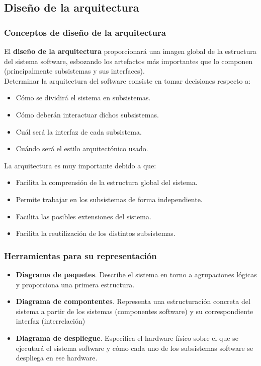 \documentclass[12pt,spanish]{article}
\begin{document}
\subsection{Diseño de la arquitectura}


\subsubsection{Conceptos de diseño de la arquitectura}

El \textbf{diseño de la arquitectura} proporcionará una imagen global de la estructura del sistema software, esbozando los artefactos más importantes que lo componen (principalmente subsistemas y sus interfaces).\\

Determinar la arquitectura del software consiste en tomar decisiones respecto a:
\begin{itemize}
	\item Cómo se dividirá el sistema en subsistemas.
	\item Cómo deberán interactuar dichos subsistemas.
	\item Cuál será la interfaz de cada subsistema.
	\item Cuándo será el estilo arquitectónico usado.
\end{itemize}

La arquitectura es muy importante debido a que:
\begin{itemize}
	\item Facilita la comprensión de la estructura global del sistema.
	\item Permite trabajar en los subsistemas de forma independiente.
	\item Facilita las posibles extensiones del sistema.
	\item Facilita la reutilización de los distintos subsistemas.
\end{itemize}


\subsubsection{Herramientas para su representación}

\begin{itemize}
	\item \textbf{Diagrama de paquetes}. Describe el sistema en torno a agrupaciones lógicas y proporciona una primera estructura.
	\item \textbf{Diagrama de compontentes}. Representa una estructuración concreta del sistema a partir de los sistemas (componentes software) y su correspondiente interfaz (interrelación)
	\item \textbf{Diagrama de despliegue}. Especifica el hardware físico sobre el que se ejecutará el sistema software y cómo cada uno de los subsistemas software se despliega en ese hardware.
\end{itemize}
\end{document}
